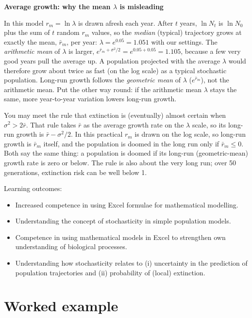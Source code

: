 \documentclass[
  a4paper]{book}
\providecommand{\tightlist}{%
  \setlength{\itemsep}{0pt}\setlength{\parskip}{0pt}}
\begin{document}
\textbf{Average growth: why the mean \(\lambda\) is misleading}

In this model \(r_m = \ln \lambda\) is drawn afresh each year. After \(t\) years, \(\ln N_t\) is \(\ln N_0\) plus the sum of \(t\) random \(r_m\) values, so the \emph{median} (typical) trajectory grows at exactly the mean, \(\bar{r}_m\), per year: \(\lambda = e^{0.05} = 1.051\) with our settings. The \emph{arithmetic mean} of \(\lambda\) is larger, \(e^{\bar{r}_m + \sigma^2/2} = e^{0.05 + 0.05} = 1.105\), because a few very good years pull the average up. A population projected with the average \(\lambda\) would therefore grow about twice as fast (on the log scale) as a typical stochastic population. Long-run growth follows the \emph{geometric mean} of \(\lambda\) (\(e^{\bar{r}_m}\)), not the arithmetic mean. Put the other way round: if the arithmetic mean \(\lambda\) stays the same, more year-to-year variation lowers long-run growth.

You may meet the rule that extinction is (eventually) almost certain when \(\sigma^2 > 2\bar{r}\). That rule takes \(\bar{r}\) as the average growth rate on the \(\lambda\) scale, so its long-run growth is \(\bar{r} - \sigma^2/2\). In this practical \(r_m\) is drawn on the log scale, so long-run growth is \(\bar{r}_m\) itself, and the population is doomed in the long run only if \(\bar{r}_m \leq 0\). Both say the same thing: a population is doomed if its long-run (geometric-mean) growth rate is zero or below. The rule is also about the very long run; over 50 generations, extinction risk can be well below 1.

Learning outcomes:

\begin{itemize}
\tightlist
\item
  Increased competence in using Excel formulae for mathematical modelling.
\item
  Understanding the concept of stochasticity in simple population models.
\item
  Competence in using mathematical models in Excel to strengthen own understanding of biological processes.
\item
  Understanding how stochasticity relates to (i) uncertainty in the prediction of population trajectories and (ii) probability of (local) extinction.
\end{itemize}

\section{Worked example}\label{worked-example-3}
\end{document}
